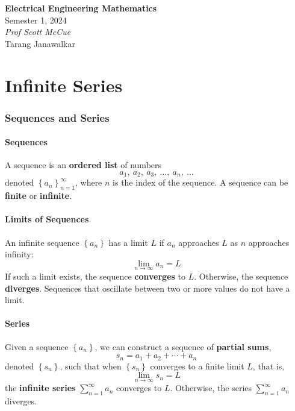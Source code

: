 \documentclass{article}
\date{}
\newcommand{\unitName}{Electrical Engineering Mathematics}
\newcommand{\unitTime}{Semester 1, 2024}
\newcommand{\unitCoordinator}{Prof Scott McCue}
\newcommand{\documentAuthors}{Tarang Janawalkar}
\begin{document}
%
\begin{titlepage}
    \vspace*{\fill}
    \begin{center}
        \LARGE{\textbf{\unitName}} \\[0.1in]
        \normalsize{\unitTime} \\[0.2in]
        \normalsize\textit{\unitCoordinator} \\[0.2in]
        \documentAuthors
    \end{center}
    \vspace*{\fill}
    \doclicenseThis
    \thispagestyle{empty}
\end{titlepage}
\newpage
%
\tableofcontents
\newpage
%
\part{Infinite Series}
\section{Sequences and Series}
\subsection{Sequences}
A sequence is an \textbf{ordered list} of numbers
\begin{equation*}
    a_1, \: a_2, \: a_3, \: \ldots, \: a_n, \: \ldots
\end{equation*}
denoted \({\left\{ a_n \right\}}_{n=1}^{\infty}\), where
\(n\) is the index of the sequence.
A sequence can be \textbf{finite} or \textbf{infinite}.
\subsection{Limits of Sequences}
An infinite sequence \(\left\{ a_n \right\}\) has a limit \(L\) if
\(a_n\) approaches \(L\) as \(n\) approaches infinity:
\begin{equation*}
    \lim_{n \to \infty} a_n = L
\end{equation*}
If such a limit exists, the sequence \textbf{converges} to \(L\).
Otherwise, the sequence \textbf{diverges}. Sequences that oscillate
between two or more values do not have a limit.
\subsection{Series}
Given a sequence \(\left\{ a_n \right\}\), we can construct a sequence
of \textbf{partial sums},
\begin{equation*}
    s_n = a_1 + a_2 + \cdots + a_n
\end{equation*}
denoted \(\left\{ s_n \right\}\), such that when \(\left\{ s_n \right\}\)
converges to a finite limit \(L\), that is,
\begin{equation*}
    \lim_{n \to \infty} s_n = L
\end{equation*}
the \textbf{infinite series} \(\sum_{n=1}^{\infty} a_n\) converges to \(L\).
Otherwise, the series \(\sum_{n=1}^{\infty} a_n\) diverges.
\end{document}
